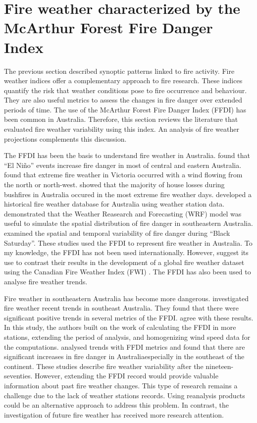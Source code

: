 \section{Fire weather characterized by the McArthur Forest Fire Danger Index}

The previous section described synoptic patterns linked to fire activity.
Fire weather indices offer a complementary approach to fire research.
These indices quantify the risk that weather conditions pose to fire
occurrence and behaviour. They are also useful metrics to assess the
changes in fire danger over extended periods of time. The use of the
McArthur Forest Fire Danger Index (FFDI) has been common in Australia.
Therefore, this section reviews the literature that evaluated fire
weather variability using this index. An analysis of fire weather
projections complements this discussion.

The FFDI has been the basis to understand fire weather in Australia.
\citet{Williams1999} found that \textquotedblleft El Ni\~no\textquotedblright{}
events increase fire danger in most of central and eastern Australia.
\citet{Long2006} found that extreme fire weather in Victoria occurred
with a wind flowing from the north or north-west. \citet{Blanchi2010}
showed that the majority of house losses during bushfires in Australia
occured in the most extreme fire weather days. \citet{Lucas2010}
developed a historical fire weather database for Australia using weather
station data. \citet{Clarke2013a} demonstrated that the Weather Reasearch
and Forecasting (WRF) model \citep{Skamarock2008} was useful to simulate
the spatial distribution of fire danger in southeastern Australia.
\citet{Engel2013} examined the spatial and temporal variability of
fire danger during ``Black Saturday''. These studies used the FFDI
to represent fire weather in Australia. To my knowledge, the FFDI
has not been used internationally. However, \citet{Field2015} suggest
its use to contrast their results in the development of a global fire
weather dataset using the Canadian Fire Weather Index (FWI) \citep{VanWagner1974}.
The FFDI has also been used to analyse fire weather trends.

Fire weather in southeastern Australia has become more dangerous.
\citet{Lucas2007} investigated fire weather recent trends in southeast
Australia. They found that there were significant positive trends
in several metrics of the FFDI. \citet{Clarke2013} agree with these
results. In this study, the authors built on the work of \citet{Lucas2010}
calculating the FFDI in more stations, extending the period of analysis,
and homogenizing wind speed data for the computations. \citet{Clarke2013}
analysed trends with FFDI metrics and found that there are significant
increases in fire danger in Australia\textemdash especially in the
southeast of the continent\textemdash . These studies describe fire
weather variability after the nineteen-seventies. However, extending
the FFDI record would provide valuable information about past fire
weather changes. This type of research remains a challenge due to
the lack of weather stations records. Using reanalysis products could
be an alternative approach to address this problem. In contrast, the
investigation of future fire weather has received more research attention.

